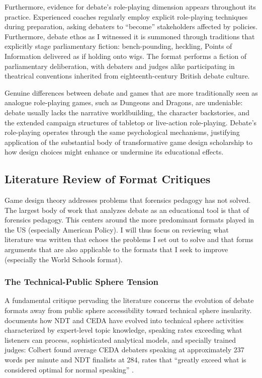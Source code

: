Furthermore, evidence for debate's role-playing dimension appears throughout its practice. Experienced coaches regularly employ explicit role-playing techniques during preparation, asking debaters to ``become'' stakeholders affected by policies. Furthermore, debate ethos as I witnessed it is summoned through traditions that explicitly stage parliamentary fiction: bench-pounding, heckling, Points of Information delivered as if holding onto wigs. The format performs a fiction of parliamentary deliberation, with debaters and judges alike participating in theatrical conventions inherited from eighteenth-century British debate culture.

Genuine differences between debate and games that are more traditionally seen as analogue role-playing games, such as Dungeons and Dragons, are undeniable: debate usually lacks the narrative worldbuilding, the character backstories, and the extended campaign structures of tabletop or live-action role-playing. Debate's role-playing operates through the same psychological mechanisms, justifying application of the substantial body of transformative game design scholarship to how design choices might enhance or undermine its educational effects.

\subsection{Literature Review of Format Critiques}

Game design theory addresses problems that forensics pedagogy has not solved. The largest body of work that analyzes debate as an educational tool is that of forensics pedagogy. This centers around the more predominant formats played in the US (especially American Policy). I will thus focus on reviewing what literature was written that echoes the problems I set out to solve and that forms arguments that are also applicable to the formats that I seek to improve (especially the World Schools format).

\subsubsection{The Technical-Public Sphere Tension}

A fundamental critique pervading the literature concerns the evolution of debate formats away from public sphere accessibility toward technical sphere insularity. \textcite{combs2002applying} documents how NDT and CEDA have evolved into technical sphere activities characterized by expert-level topic knowledge, speaking rates exceeding what listeners can process, sophisticated analytical models, and specially trained judges: Colbert found average CEDA debaters speaking at approximately 237 words per minute and NDT finalists at 284, rates that ``greatly exceed what is considered optimal for normal speaking'' \parencite[p.~36]{combs2002applying}.

